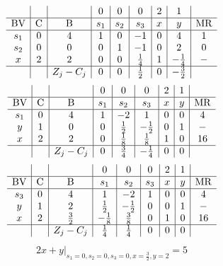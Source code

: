 \documentclass{article}
\begin{document}
\begin{align*}
\begin{array}{c|c|c|c|c|c|c|c|c}
 &  &  & 0 & 0 & 0 & 2 & 1 & \\
\hline
\text{BV} & \text{C} & \text{B} & s_{1} & s_{2} & s_{3} & x & y & \text{MR} \\
\hline
s_{1} & 0 & 4 & 1 & 0 & -1 & 0 & 4 & 1 \\
s_{2} & 0 & 0 & 0 & 1 & -1 & 0 & 2 & 0 \\
x & 2 & 2 & 0 & 0 & \frac{1}{4} & 1 & -\frac{1}{4} & - \\
\hline
 &  & Z_j-C_j & 0 & 0 & \frac{1}{2} & 0 & -\frac{3}{2} & \\
\end{array}
\end{align*}
\begin{align*}
\begin{array}{c|c|c|c|c|c|c|c|c}
 &  &  & 0 & 0 & 0 & 2 & 1 & \\
\hline
\text{BV} & \text{C} & \text{B} & s_{1} & s_{2} & s_{3} & x & y & \text{MR} \\
\hline
s_{1} & 0 & 4 & 1 & -2 & 1 & 0 & 0 & 4 \\
y & 1 & 0 & 0 & \frac{1}{2} & -\frac{1}{2} & 0 & 1 & - \\
x & 2 & 2 & 0 & \frac{1}{8} & \frac{1}{8} & 1 & 0 & 16 \\
\hline
 &  & Z_j-C_j & 0 & \frac{3}{4} & -\frac{1}{4} & 0 & 0 & \\
\end{array}
\end{align*}
\begin{align*}
\begin{array}{c|c|c|c|c|c|c|c|c}
 &  &  & 0 & 0 & 0 & 2 & 1 & \\
\hline
\text{BV} & \text{C} & \text{B} & s_{1} & s_{2} & s_{3} & x & y & \text{MR} \\
\hline
s_{3} & 0 & 4 & 1 & -2 & 1 & 0 & 0 & 4 \\
y & 1 & 2 & \frac{1}{2} & -\frac{1}{2} & 0 & 0 & 1 & - \\
x & 2 & \frac{3}{2} & -\frac{1}{8} & \frac{3}{8} & 0 & 1 & 0 & 16 \\
\hline
 &  & Z_j-C_j & \frac{1}{4} & \frac{1}{4} & 0 & 0 & 0 & \\
\end{array}
\end{align*}
\begin{align*}
\left.2x + y\right|_{s_{1}=0,s_{2}=0,s_{3}=0,x=\frac{3}{2},y=2}=5\end{align*}
\end{document}
